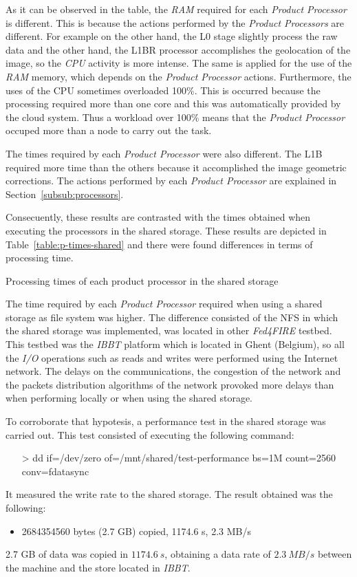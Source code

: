 As it can be observed in the table, the \emph{RAM} required for each
\emph{Product Processor} is different. This is because the actions performed by
the \emph{Product Processors} are different. For example on the other hand, the L0
stage slightly process the raw data and the other hand, the L1BR processor
accomplishes the geolocation of the image, so the \emph{CPU} activity is more intense. 
The same is applied for the use of the \emph{RAM} memory, which depends on the
\emph{Product Processor} actions.
Furthermore, the
uses of the \ac{CPU} sometimes overloaded 100\%. This is occurred because the processing
required more than one core and this was automatically provided by the cloud
system. Thus a workload  over 100\% means that the
\emph{Product Processor} occuped more than a node to carry out the task.

The times required by each \emph{Product Processor} were also different. The L1B
required more time than the others because it accomplished the image
geometric corrections. The actions performed by each \emph{Product Processor} are
explained in Section~\ref{subsub:processors}. 



Consecuently, these results are contrasted with the times obtained when executing
the processors in the shared storage. These results are depicted in Table~\ref{table:p-times-shared}
and there were found differences in terms of processing time.

\begin{table}[!h]
  \centering
  {\small
  
  }
  \caption{Processing times of each product processor in the shared storage}
  \label{table:p-times-shared}
\end{table}

The time  required by each \emph{Product Processor} required when using a shared
storage as file system was higher. The difference consisted of the \ac{NFS} in which
the shared storage was implemented, was located
in other \emph{Fed4FIRE} testbed. This testbed was the \emph{IBBT} platform which is located in
Ghent (Belgium), so all the \emph{I/O} operations such as reads and writes were performed
using the Internet network. The delays on the communications, the congestion of
the network and the packets distribution algorithms of the network provoked more
delays than when performing locally or when using the shared storage.  

To corroborate that hypotesis, a performance test in the shared storage was carried out. This test
consisted of executing the following command:
\begin{itemize}
\item[>] dd if=/dev/zero of=/mnt/shared/test-performance bs=1M count=2560
  conv=fdatasync
\end{itemize}
It measured the write rate to the shared storage. The result obtained was the
following:
\begin{itemize}
\item 2684354560 bytes (2.7 GB) copied, 1174.6 s, 2.3 MB/s
\end{itemize}
2.7 GB of data was copied in $1174.6~s$, obtaining a data rate  of $2.3~MB/s$ between the
\bonfire machine and the store located in \emph{IBBT}. 

